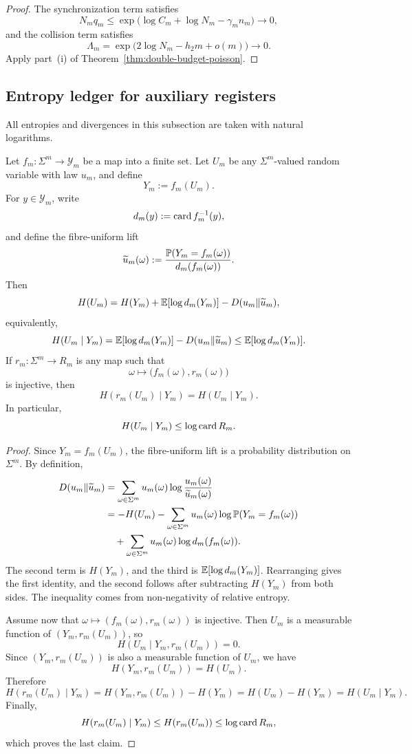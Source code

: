 \begin{proof}
The synchronization term satisfies
\[
  N_m q_m
  \leq \exp\bigl(\log C_m+\log N_m-\gamma_m n_m\bigr)
  \longrightarrow 0,
\]
and the collision term satisfies
\[
  \Lambda_m
  = \exp\bigl(2\log N_m-h_2m+o(m)\bigr)
  \longrightarrow 0.
\]
Apply part~(i) of Theorem~\ref{thm:double-budget-poisson}.
\end{proof}

\subsection{Entropy ledger for auxiliary registers}

All entropies and divergences in this subsection are taken with natural
logarithms.

\begin{theorem}
\label{thm:entropy-ledger}
Let \(f_m:\Sigma^m\to \mathcal{Y}_m\) be a map into a finite set.  Let \(U_m\) be
any \(\Sigma^m\)-valued random variable with law \(u_m\), and define
\[
  Y_m:=f_m(U_m).
\]
For \(y\in \mathcal{Y}_m\), write
\[
  d_m(y):=\operatorname{card}{f_m^{-1}(y)},
\]
and define the fibre-uniform lift
\[
  \widetilde u_m(\omega)
  := \frac{\mathbb{P}(Y_m=f_m(\omega))}
           {d_m(f_m(\omega))}.
\]
Then
\[
  H(U_m)
  = H(Y_m)+\mathbb{E}[\log d_m(Y_m)]-D(u_m\Vert \widetilde u_m),
\]
equivalently,
\[
  H(U_m\mid Y_m)
  = \mathbb{E}[\log d_m(Y_m)]-D(u_m\Vert \widetilde u_m)
  \leq \mathbb{E}[\log d_m(Y_m)].
\]
If \(r_m:\Sigma^m\to R_m\) is any map such that
\[
  \omega\longmapsto \bigl(f_m(\omega),r_m(\omega)\bigr)
\]
is injective, then
\[
  H(r_m(U_m)\mid Y_m)=H(U_m\mid Y_m).
\]
In particular,
\[
  H(U_m\mid Y_m)\leq \log\operatorname{card}{R_m}.
\]
\end{theorem}

\begin{proof}
Since \(Y_m=f_m(U_m)\), the fibre-uniform lift is a probability
distribution on \(\Sigma^m\).  By definition,
\begin{align*}
  D(u_m\Vert \widetilde u_m)
  &= \sum_{\omega\in\Sigma^m}
      u_m(\omega)\log\frac{u_m(\omega)}{\widetilde u_m(\omega)} \\
  &= -H(U_m)
     - \sum_{\omega\in\Sigma^m}
        u_m(\omega)\log \mathbb{P}(Y_m=f_m(\omega)) \\
  &\quad
     + \sum_{\omega\in\Sigma^m}
        u_m(\omega)\log d_m(f_m(\omega)).
\end{align*}
The second term is \(H(Y_m)\), and the third is
\(\mathbb{E}[\log d_m(Y_m)]\).  Rearranging gives the first identity, and the
second follows after subtracting \(H(Y_m)\) from both sides.  The
inequality comes from non-negativity of relative entropy.

Assume now that \(\omega\mapsto(f_m(\omega),r_m(\omega))\) is injective.
Then \(U_m\) is a measurable function of \((Y_m,r_m(U_m))\), so
\[
  H(U_m\mid Y_m,r_m(U_m))=0.
\]
Since \((Y_m,r_m(U_m))\) is also a measurable function of \(U_m\), we
have
\[
  H(Y_m,r_m(U_m))=H(U_m).
\]
Therefore
\[
  H(r_m(U_m)\mid Y_m)
  = H(Y_m,r_m(U_m))-H(Y_m)
  = H(U_m)-H(Y_m)
  = H(U_m\mid Y_m).
\]
Finally,
\[
  H(r_m(U_m)\mid Y_m)\leq H(r_m(U_m))\leq \log\operatorname{card}{R_m},
\]
which proves the last claim.
\end{proof}

